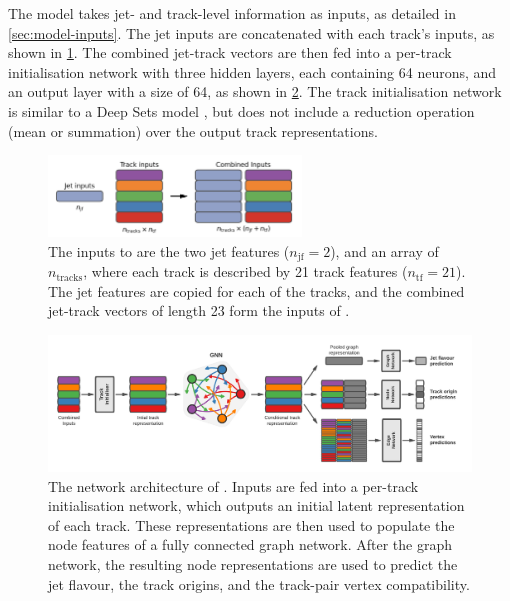 The model takes jet- and track-level information as inputs, as detailed in \cref{sec:model-inputs}.
The jet inputs are concatenated with each track's inputs, as shown in \cref{fig:model_input_array}.
The combined jet-track vectors are then fed into a per-track initialisation network with three hidden layers, each containing 64 neurons, and an output layer with a size of 64, as shown in \cref{fig:new_arch}. 
The track initialisation network is similar to a Deep Sets model \cite{zaheer2018deep}, but does not include a reduction operation (mean or summation) over the output track representations.

\begin{figure}[!htbp]
    \centering
    \includegraphics[width=0.6\textwidth]{chapters/gnn_tagger/figs/inputs_diagram.png}
    \caption{The inputs to \GNN are the two jet features ($n_\text{jf} = 2$), and an array of $n_{\text{tracks}}$, where each track is described by 21 track features ($n_\text{tf} = 21$). The jet features are copied for each of the tracks, and the combined jet-track vectors of length 23 form the inputs of \GNN.}
    \label{fig:model_input_array}
\end{figure}

\begin{figure}[!htbp]
    \centering
    \includegraphics[width=\textwidth]{chapters/gnn_tagger/figs/full_arch.pdf}
    \caption{The network architecture of \GNN. Inputs are fed into a per-track initialisation network, which outputs an initial latent representation of each track. These representations are then used to populate the node features of a fully connected graph network. After the graph network, the resulting node representations are used to predict the jet flavour, the track origins, and the track-pair vertex compatibility.}
    \label{fig:new_arch}
\end{figure}


